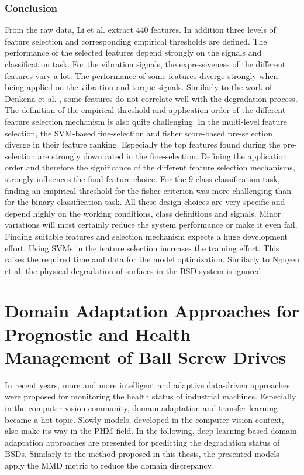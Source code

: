 \subsubsection{Conclusion}
From the raw data, Li et al. \cite{LiPin2018} extract 440 features. In addition three levels of feature selection and corresponding empirical thresholds are defined. The performance of the selected features depend strongly on the signals and classification task. For the vibration signals, the expressiveness of the different features vary a lot. The performance of some features diverge strongly when being applied on the vibration and torque signals. Similarly to the work of Denkena et al. \cite{Denkena2021}, some features do not correlate well with the degradation process. The definition of the empirical threshold and application order of the different feature selection mechanism is also quite challenging. In the multi-level feature selection, the SVM-based fine-selection and fisher score-based pre-selection diverge in their feature ranking. Especially the top features found during the pre-selection are strongly down rated in the fine-selection. Defining the application order and therefore the significance of the different feature selection mechanisms, strongly influences the final feature choice. For the 9 class classification task, finding an empirical threshold for the fisher criterion was more challenging than for the binary classification task. All these design choices are very specific and depend highly on the working conditions, class definitions and signals. Minor variations will most certainly reduce the system performance or make it even fail. Finding suitable features and selection mechanism expects a huge development effort. Using SVMs in the feature selection increases the training effort. This raises the required time and data for the model optimization. Similarly to Nguyen et al. \cite{NGUYEN2019} the physical degradation of surfaces in the BSD system is ignored. 

\section{Domain Adaptation Approaches for Prognostic and Health Management of Ball Screw Drives}
In recent years, more and more intelligent and adaptive data-driven approaches were proposed for monitoring the health status of industrial machines. Especially in the computer vision community, domain adaptation and transfer learning became a hot topic. Slowly models, developed in the computer vision context, also make its way in the PHM field. In the following, deep learning-based domain adaptation approaches are presented for predicting the degradation status of BSDs. Similarly to the method proposed in this thesis, the presented models apply the MMD metric to reduce the domain discrepancy.


